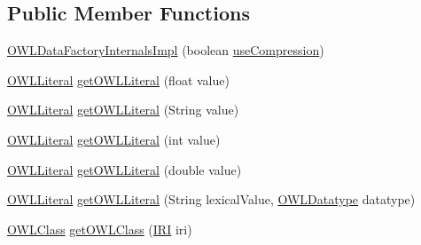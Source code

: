 \subsection*{Public Member Functions}
\begin{DoxyCompactItemize}
\item 
\hyperlink{classuk_1_1ac_1_1manchester_1_1cs_1_1owl_1_1owlapi_1_1_o_w_l_data_factory_internals_impl_a390f1b7a115dd02e7f2ea60ef975a34c}{O\-W\-L\-Data\-Factory\-Internals\-Impl} (boolean \hyperlink{classuk_1_1ac_1_1manchester_1_1cs_1_1owl_1_1owlapi_1_1_internals_no_cache_a1beef4bccf6fba4712e20f92f7726b38}{use\-Compression})
\item 
\hyperlink{interfaceorg_1_1semanticweb_1_1owlapi_1_1model_1_1_o_w_l_literal}{O\-W\-L\-Literal} \hyperlink{classuk_1_1ac_1_1manchester_1_1cs_1_1owl_1_1owlapi_1_1_o_w_l_data_factory_internals_impl_a2d0d8878a9e7ade00054a3a7a66b7152}{get\-O\-W\-L\-Literal} (float value)
\item 
\hyperlink{interfaceorg_1_1semanticweb_1_1owlapi_1_1model_1_1_o_w_l_literal}{O\-W\-L\-Literal} \hyperlink{classuk_1_1ac_1_1manchester_1_1cs_1_1owl_1_1owlapi_1_1_o_w_l_data_factory_internals_impl_a0903d03d69f9519fb0716b6d303b999d}{get\-O\-W\-L\-Literal} (String value)
\item 
\hyperlink{interfaceorg_1_1semanticweb_1_1owlapi_1_1model_1_1_o_w_l_literal}{O\-W\-L\-Literal} \hyperlink{classuk_1_1ac_1_1manchester_1_1cs_1_1owl_1_1owlapi_1_1_o_w_l_data_factory_internals_impl_a202f8cfed7fe800a478014996380ff3e}{get\-O\-W\-L\-Literal} (int value)
\item 
\hyperlink{interfaceorg_1_1semanticweb_1_1owlapi_1_1model_1_1_o_w_l_literal}{O\-W\-L\-Literal} \hyperlink{classuk_1_1ac_1_1manchester_1_1cs_1_1owl_1_1owlapi_1_1_o_w_l_data_factory_internals_impl_a86457e7f4ac8eb736024f101ce5ca36c}{get\-O\-W\-L\-Literal} (double value)
\item 
\hyperlink{interfaceorg_1_1semanticweb_1_1owlapi_1_1model_1_1_o_w_l_literal}{O\-W\-L\-Literal} \hyperlink{classuk_1_1ac_1_1manchester_1_1cs_1_1owl_1_1owlapi_1_1_o_w_l_data_factory_internals_impl_a9336b73289b81bcf077fe095ba60f904}{get\-O\-W\-L\-Literal} (String lexical\-Value, \hyperlink{interfaceorg_1_1semanticweb_1_1owlapi_1_1model_1_1_o_w_l_datatype}{O\-W\-L\-Datatype} datatype)
\item 
\hyperlink{interfaceorg_1_1semanticweb_1_1owlapi_1_1model_1_1_o_w_l_class}{O\-W\-L\-Class} \hyperlink{classuk_1_1ac_1_1manchester_1_1cs_1_1owl_1_1owlapi_1_1_o_w_l_data_factory_internals_impl_a7da1ee51ca2d3119c569c4bc300d463a}{get\-O\-W\-L\-Class} (\hyperlink{classorg_1_1semanticweb_1_1owlapi_1_1model_1_1_i_r_i}{I\-R\-I} iri)

\end{DoxyCompactItemize}
